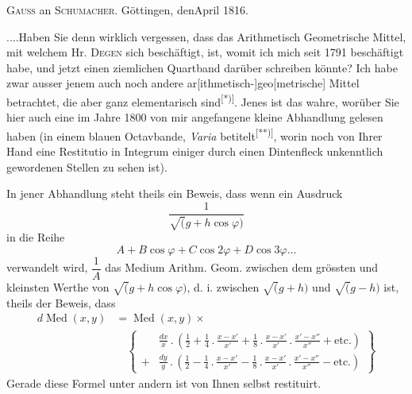 \begingroup
{}
\begin{center}\textsc{Gauss} an \textsc{Schumacher}. Göttingen, den\quad\quad April 1816.\end{center}
\noindent .\enspace .\enspace .\enspace .\quad Haben Sie denn wirklich vergessen, dass das Arithmetisch Geometrische Mittel, mit welchem Hr. \textsc{Degen} sich beschäftigt,  ist, womit ich mich seit 1791 beschäftigt habe, und jetzt einen ziemlichen Quartband darüber schreiben könnte? Ich habe zwar ausser jenem auch noch andere ar[ithmetisch-]geo[metrische] Mittel betrachtet, die aber ganz elementarisch sind\textsuperscript{[*)]}. Jenes ist das wahre, worüber Sie hier auch eine im Jahre 1800 von mir angefangene kleine Abhandlung gelesen haben (in einem blauen Octavbande, \textit{Varia} betitelt\textsuperscript{[**)]}, worin noch von Ihrer Hand eine Restitutio in Integrum einiger durch einen Dintenfleck unkenntlich gewordenen Stellen zu sehen ist).

\par\indent In jener Abhandlung steht theils ein Beweis, dass wenn ein Ausdruck
\[
\frac{1}{\surd(g+h\cos\varphi)}
\]
\noindent in die Reihe
\[
A+B\cos\varphi+C\cos2\varphi+D\cos3\varphi\ldots
\]
\noindent verwandelt wird, $\dfrac1A$ das Medium Arithm. Geom. zwischen dem grössten und kleinsten Werthe von $\surd(g+h\cos\varphi)$, d. i. zwischen $\surd(g+h)$ und $\surd(g-h)$ ist, theils der Beweis, dass
\[
\begin{aligned}
d\operatorname{Med}(x,y)&=\operatorname{Med}(x,y)\times\\
&\quad\left\{\begin{aligned}
&\frac{dx}{x}\, .\,\left(\frac12+\frac14\, .\,\frac{x-x'}{x'}+\frac18\, .\,\frac{x-x'}{x'}\, .\,\frac{x'-x''}{x''}+\text{etc.}\right)\\[6pt]
{}+&\frac{dy}{y}\, .\,\left(\frac12-\frac14\, .\,\frac{x-x'}{x'}-\frac18\, .\,\frac{x-x'}{x'}\, .\,\frac{x'-x''}{x''}-\text{etc.}\right)
\end{aligned}\right\}
\end{aligned}
\]
\noindent Gerade diese Formel unter andern ist von Ihnen selbst restituirt.

